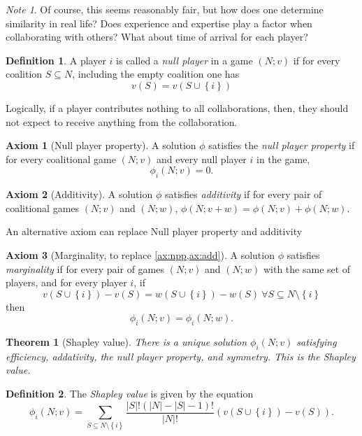 \documentclass[12pt,letterpaper,final]{article}
\theoremstyle{plain}
\newtheorem{theorem}{Theorem}[section]
\theoremstyle{plain}
\theoremstyle{plain}
\theoremstyle{plain}
\theoremstyle{plain}
\theoremstyle{plain}
\theoremstyle{plain}
\theoremstyle{definition}
\newtheorem{definition}{Definition}[section]
\theoremstyle{definition}
\theoremstyle{definition}
\theoremstyle{definition}
\theoremstyle{definition}
\newtheorem{axiom}{Axiom}[section]
\theoremstyle{remark}
\theoremstyle{remark}
\newtheorem*{note}{Note}
\theoremstyle{remark}
\theoremstyle{remark}
\begin{document}
\begin{note}
  Of course, this seems reasonably fair, but how does one determine
  similarity in real life?  Does experience and expertise play a
  factor when collaborating with others? What about time of arrival
  for each player?
\end{note}

\begin{definition}
  A player \(i\) is called a \emph{null player} in a game \((N;v)\) if for
  every coalition \(S \subseteq N\), including the empty coalition
  one has 
  \[v(S) = v(S\cup \left\{i\right\}) \]
\end{definition}

Logically, if a player contributes nothing to all collaborations,
then, they should not 
expect to receive anything from the collaboration.

\begin{axiom}[Null player property]\label{ax:npp}
  A solution \(\phi\) satisfies the \emph{null player property}
  if 
  for every coalitional game \((N;v)\) and every null player \(i\)
  in the game,
  \[\phi_i(N;v) = 0.\]
\end{axiom}

\begin{axiom}[Additivity]\label{ax:add}
  A solution \(\phi\) satisfies \emph{additivity} if for every 
  pair of coalitional games \((N;v)\) and \((N;w)\),
  \(\phi(N;v+w) = \phi(N;v)+ \phi(N;w)\).
\end{axiom}

An alternative axiom can replace Null player property and
additivity

\begin{axiom}[Marginality, to replace \cref{ax:npp,ax:add}] 
  A solution \(\phi\) satisfies \emph{marginality} if for every
  pair of 
  games \((N;v)\) and \((N;w)\) with the same set of players, and for
  every player \(i\), if  
  \[v(S\cup\left\{i\right\}) - v(S) = w(S\cup\left\{i\right\}) - w(S)
    ~\forall S \subseteq N\setminus \left\{i\right\} \] 
  then
  \[\phi_i(N;v) = \phi_i(N;w).\]
\end{axiom}

\begin{theorem}[Shapley value]
  There is a unique solution \(\phi_i(N;v)\) satisfying efficiency, addativity, the
  null player property, and symmetry. 
  This is the Shapley value.
\end{theorem}

\begin{definition}
  The \emph{Shapley value} is given by the equation
  \[
    \phi_i(N;v) = \sum_{S\subseteq N\setminus\left\{i\right\}}
    \frac{|S|! (|N|-|S| - 1)!}{|N|!}\left(v(S\cup \left\{i\right\}) -
      v(S)\right).
  \]
\end{definition}
\end{document}
